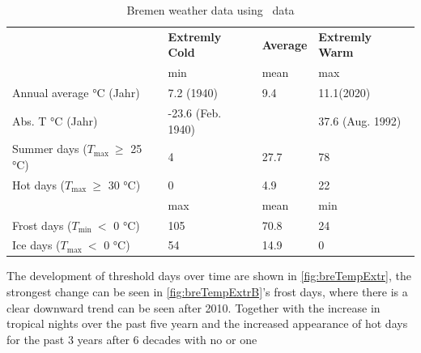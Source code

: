 \documentclass[12pt,a4paper, english,twoside]{article}
\begin{document}
      \begin{table}[ht]
        \centering
        \caption{Bremen weather data using~\autocite{DWD2024a} data\label{tab:statsBremen}}
        \renewcommand{\arraystretch}{1.4}
        \begin{tabular}{p{3.5cm}p{2.5cm}lp{2.5cm}}
          \toprule
          & \textbf{Extremly Cold} & \textbf{Average} & \textbf{Extremly Warm} \\
          & min & mean & max \\
          \midrule
          Annual average °C \newline (Jahr)     &   7.2 \newline(1940)       & 9.4    & 11.1\newline (2020)      \\
          Abs. T °C \newline (Jahr)             & -23.6 \newline(Feb. 1940)  &        & 37.6 \newline(Aug. 1992) \\
          Summer days \newline($T_{\max}~\ge$  25 °C) & 4                    & 27.7   & 78 \\
          Hot days \newline($T_{\max}~\ge$  30 °C)    & 0                    & 4.9    & 22 \\
          \midrule
          & max & mean & min \\
          \midrule
          Frost days \newline($T_{\min}~<$  0 °C)     & 105         & 70.8   & 24 \\
          Ice days \newline($T_{\max}~<$  0 °C)       & 54          & 14.9   & 0  \\
          \bottomrule
        \end{tabular}
      \end{table}
      The development of threshold days over time are shown in \cref{fig:breTempExtr}, the strongest change can be seen in \cref{fig:breTempExtrB}'s frost days, where there is a clear downward trend can be seen after 2010. 
      Together with the increase in tropical nights over the past five yearn and the increased appearance of hot days for the past 3 years after 6 decades with no or one
\end{document}
